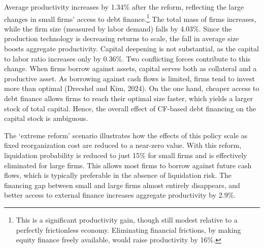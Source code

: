 \documentclass[12pt]{article}
\begin{document}
Average productivity increases by 1.34\% after the reform, reflecting the large changes in small firms' access to debt finance.\footnote{This is a significant productivity gain, though still modest relative to a perfectly frictionless economy. Eliminating financial frictions, by making equity finance freely available, would raise productivity by 16\%.} The total mass of firms increases, while the firm size (measured by labor demand) falls by 4.03\%. Since the production technology is decreasing returns to scale, the fall in average size boosts aggregate productivity. Capital deepening is not substantial, as the capital to labor ratio increases only by 0.36\%. Two conflicting forces contribute to this change. When firms borrow against assets, capital serves both as collateral and a productive asset. As borrowing against cash flows is limited, firms tend to invest more than optimal (Drecshel and Kim, 2024). On the one hand, cheaper access to debt finance allows firms to reach their optimal size faster, which yields a larger stock of total capital. Hence, the overall effect of CF-based debt financing on the capital stock is ambiguous.

The `extreme reform' scenario illustrates how the effects of this policy scale as fixed reorganization cost are reduced to a near-zero value. With this reform, liquidation probability is reduced to just 15\% for small firms and is effectively eliminated for large firms. This allows most firms to borrow against future cash flows, which is typically preferable in the absence of liquidation risk. The financing gap between small and large firms almost entirely disappears, and better access to external finance increases aggregate productivity by 2.9\%. 
 
\end{document}
